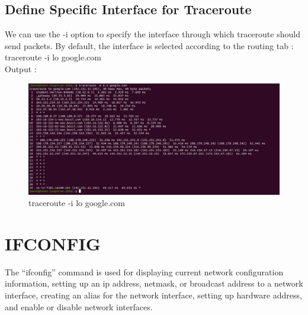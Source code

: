 \documentclass[11pt]{article}
\begin{document}
\subsection{Define Specific Interface for Traceroute}
We can use the -i option to specify the interface through which traceroute should send packets. By default, the interface is selected according to the routing tab :\\[6pt]
  traceroute -i lo google.com\\[12pt]   
        Output : 
  \begin{figure}[!h]
\centering
\includegraphics[width=\textwidth]{increase_trace.png}
\caption{traceroute -i lo google.com}
\end{figure}

\section{IFCONFIG}
The “ifconfig” command is used for displaying current network configuration information, setting up an ip address, netmask, or broadcast address to a network interface, creating an alias for the network interface, setting up hardware address, and enable or disable network interfaces.
\end{document}

